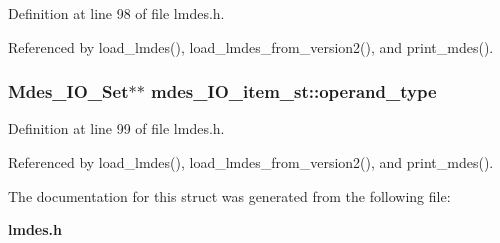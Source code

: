 Definition at line 98 of file lmdes.h.

Referenced by load\_\-lmdes(), load\_\-lmdes\_\-from\_\-version2(), and print\_\-mdes().
\subsubsection{\setlength{\rightskip}{0pt plus 5cm}\bf{Mdes\_\-IO\_\-Set}$\ast$$\ast$ \bf{mdes\_\-IO\_\-item\_\-st::operand\_\-type}}\label{structmdes__IO__item__st_f4ba7b4037f1fcfc0e390decda737443}




Definition at line 99 of file lmdes.h.

Referenced by load\_\-lmdes(), load\_\-lmdes\_\-from\_\-version2(), and print\_\-mdes().

The documentation for this struct was generated from the following file:\begin{CompactItemize}
\item 
\bf{lmdes.h}\end{CompactItemize}
